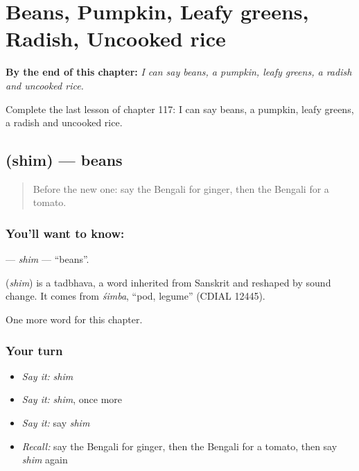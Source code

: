 
\chapter{Beans, Pumpkin, Leafy greens, Radish, Uncooked rice}
\label{ch:bn-beans-pumpkin-leafy-greens-radish-uncooked-rice}

\begin{chapteropening}
\textbf{By the end of this chapter:} \emph{I can say beans, a pumpkin, leafy greens, a radish and uncooked rice.}

Complete the last lesson of chapter 117: I can say beans, a pumpkin, leafy greens, a radish and uncooked rice.
\end{chapteropening}

\section[\texorpdfstring{\bn{শিম} (shim)}{শিম (shim)}]{ (shim) — beans}

\label{lesson:BN-C117-shim}



\begin{quote}
Before the new one: say the Bengali for ginger, then the Bengali for a tomato.
\end{quote}

\subsection*{You'll want to know: }
\textbf{} — \emph{shim} — \textquotedblleft{}beans\textquotedblright{}.

\begin{cousinweb}
\textbf{} (\emph{shim}) is a tadbhava, a word inherited from Sanskrit and reshaped by sound change. It comes from \emph{śimba}, \textquotedblleft{}pod, legume\textquotedblright{} (CDIAL 12445).
\end{cousinweb}

\begin{grammarlens}[title={What you've built}]
One more word for this chapter.
\end{grammarlens}

\subsection*{Your turn}
\begin{itemize}
\raggedright
  \item \emph{Say it:} \emph{shim}
  \item \emph{Say it:} \emph{shim}, once more
  \item \emph{Say it:} say \emph{shim}
  \item \emph{Recall:} say the Bengali for ginger, then the Bengali for a tomato, then say \emph{shim} again
\end{itemize}

